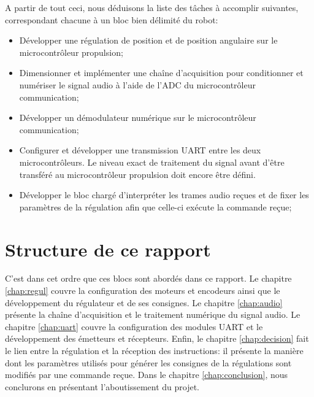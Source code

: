 A partir de tout ceci, nous déduisons la liste des tâches à accomplir suivantes, correspondant chacune à un bloc bien délimité du robot:
\begin{itemize}
  \item Développer une régulation de position et de position angulaire sur le microcontrôleur propulsion;
  \item Dimensionner et implémenter une chaîne d'acquisition pour conditionner et numériser le signal audio à l'aide de l'ADC du microcontrôleur communication;
  \item Développer un démodulateur numérique sur le microcontrôleur communication;
  \item Configurer et développer une transmission UART entre les deux microcontrôleurs. Le niveau exact de traitement du signal avant d'être transféré au microcontrôleur propulsion doit encore être défini.
  \item Développer le bloc chargé d'interpréter les trames audio reçues et de fixer les paramètres de la régulation afin que celle-ci exécute la commande reçue;
\end{itemize}

\section{Structure de ce rapport}
C'est dans cet ordre que ces blocs sont abordés dans ce rapport. Le chapitre \ref{chap:regul} couvre la configuration des moteurs et encodeurs ainsi que le développement du régulateur et de ses consignes. Le chapitre \ref{chap:audio} présente la chaîne d'acquisition et le traitement numérique du signal audio. Le chapitre \ref{chap:uart} couvre la configuration des modules UART et le développement des émetteurs et récepteurs. Enfin, le chapitre \ref{chap:decision} fait le lien entre la régulation et la réception des instructions: il présente la manière dont les paramètres utilisés pour générer les consignes de la régulations sont modifiés par une commande reçue. Dans le chapitre \ref{chap:conclusion}, nous conclurons en présentant l'aboutissement du projet.
